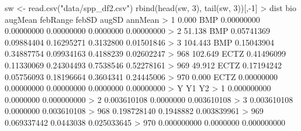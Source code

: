 \documentclass[
  letterpaper,
]{book}
\newenvironment{Shaded}{\begin{snugshade}}{\end{snugshade}}
\newcommand{\DecValTok}[1]{\textcolor[rgb]{0.68,0.00,0.00}{#1}}
\newcommand{\FloatTok}[1]{\textcolor[rgb]{0.68,0.00,0.00}{#1}}
\newcommand{\FunctionTok}[1]{\textcolor[rgb]{0.28,0.35,0.67}{#1}}
\newcommand{\NormalTok}[1]{\textcolor[rgb]{0.00,0.23,0.31}{#1}}
\newcommand{\OtherTok}[1]{\textcolor[rgb]{0.00,0.23,0.31}{#1}}
\newcommand{\SpecialCharTok}[1]{\textcolor[rgb]{0.37,0.37,0.37}{#1}}
\newcommand{\StringTok}[1]{\textcolor[rgb]{0.13,0.47,0.30}{#1}}
\begin{document}
\begin{Shaded}
\begin{Highlighting}[]
\NormalTok{sw }\OtherTok{\textless{}{-}} \FunctionTok{read.csv}\NormalTok{(}\StringTok{"data/spp\_df2.csv"}\NormalTok{)}
\FunctionTok{rbind}\NormalTok{(}\FunctionTok{head}\NormalTok{(sw, }\DecValTok{3}\NormalTok{), }\FunctionTok{tail}\NormalTok{(sw, }\DecValTok{3}\NormalTok{))[,}\SpecialCharTok{{-}}\DecValTok{1}\NormalTok{]}
\SpecialCharTok{\textgreater{}}\NormalTok{        dist  bio    augMean   febRange      febSD     augSD    annMean}
\SpecialCharTok{\textgreater{}} \DecValTok{1}     \FloatTok{0.000}\NormalTok{  BMP }\FloatTok{0.00000000} \FloatTok{0.00000000} \FloatTok{0.00000000} \FloatTok{0.0000000} \FloatTok{0.00000000}
\SpecialCharTok{\textgreater{}} \DecValTok{2}    \FloatTok{51.138}\NormalTok{  BMP }\FloatTok{0.05741369} \FloatTok{0.09884404} \FloatTok{0.16295271} \FloatTok{0.3132800} \FloatTok{0.01501846}
\SpecialCharTok{\textgreater{}} \DecValTok{3}   \FloatTok{104.443}\NormalTok{  BMP }\FloatTok{0.15043904} \FloatTok{0.34887754} \FloatTok{0.09934163} \FloatTok{0.4188239} \FloatTok{0.02602247}
\SpecialCharTok{\textgreater{}} \DecValTok{968} \FloatTok{102.649}\NormalTok{ ECTZ }\FloatTok{0.41496099} \FloatTok{0.11330069} \FloatTok{0.24304493} \FloatTok{0.7538546} \FloatTok{0.52278161}
\SpecialCharTok{\textgreater{}} \DecValTok{969}  \FloatTok{49.912}\NormalTok{ ECTZ }\FloatTok{0.17194242} \FloatTok{0.05756093} \FloatTok{0.18196664} \FloatTok{0.3604341} \FloatTok{0.24445006}
\SpecialCharTok{\textgreater{}} \DecValTok{970}   \FloatTok{0.000}\NormalTok{ ECTZ }\FloatTok{0.00000000} \FloatTok{0.00000000} \FloatTok{0.00000000} \FloatTok{0.0000000} \FloatTok{0.00000000}
\SpecialCharTok{\textgreater{}}\NormalTok{               Y        Y1          Y2}
\SpecialCharTok{\textgreater{}} \DecValTok{1}   \FloatTok{0.000000000} \FloatTok{0.0000000} \FloatTok{0.000000000}
\SpecialCharTok{\textgreater{}} \DecValTok{2}   \FloatTok{0.003610108} \FloatTok{0.0000000} \FloatTok{0.003610108}
\SpecialCharTok{\textgreater{}} \DecValTok{3}   \FloatTok{0.003610108} \FloatTok{0.0000000} \FloatTok{0.003610108}
\SpecialCharTok{\textgreater{}} \DecValTok{968} \FloatTok{0.198728140} \FloatTok{0.1948882} \FloatTok{0.003839961}
\SpecialCharTok{\textgreater{}} \DecValTok{969} \FloatTok{0.069337442} \FloatTok{0.0443038} \FloatTok{0.025033645}
\SpecialCharTok{\textgreater{}} \DecValTok{970} \FloatTok{0.000000000} \FloatTok{0.0000000} \FloatTok{0.000000000}
\end{Highlighting}
\end{Shaded}
\end{document}

